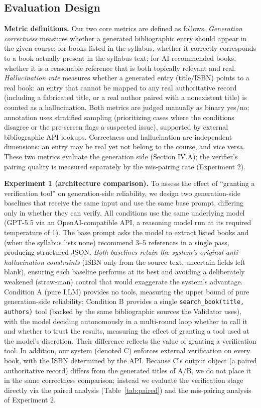 \documentclass[conference]{IEEEtran}
\begin{document}
\subsection{Evaluation Design}
\textbf{Metric definitions.} Our two core metrics are defined as follows.
\textit{Generation correctness} measures whether a generated bibliographic
entry should appear in the given course: for books listed in the syllabus,
whether it correctly corresponds to a book actually present in the syllabus
text; for AI-recommended books, whether it is a reasonable reference that is
both topically relevant and real. \textit{Hallucination rate} measures whether
a generated entry (title/ISBN) points to a real book: an entry that cannot be
mapped to any real authoritative record (including a fabricated title, or a
real author paired with a nonexistent title) is counted as a hallucination.
Both metrics are judged manually as binary yes/no; annotation uses stratified
sampling (prioritizing cases where the conditions disagree or the pre-screen
flags a suspected issue), supported by external bibliographic API lookups.
Correctness and hallucination are independent dimensions: an entry may be real
yet not belong to the course, and vice versa. These two metrics
evaluate the generation side (Section IV.A); the verifier's pairing quality is
measured separately by the mis-pairing rate (Experiment 2).

\textbf{Experiment 1 (architecture comparison).} To assess the effect of
``granting a verification tool'' on generation-side reliability, we design two
generation-side baselines that receive the same input and use the same base
prompt, differing only in whether they can verify. All conditions use the same underlying model (GPT-5.5 via an OpenAI-compatible
API, a reasoning model run at its required temperature of 1). The base prompt
asks the model to extract listed books and (when the syllabus lists none)
recommend 3--5 references in a single pass, producing structured JSON.
\textit{Both baselines retain the system's original anti-hallucination
constraints} (ISBN only from
the source text, uncertain fields left blank), ensuring each baseline performs
at its best and avoiding a deliberately weakened (straw-man) control that would
exaggerate the system's advantage. Condition A (pure LLM) provides no tools,
measuring the upper bound of pure generation-side reliability; Condition B
provides a single \texttt{search\_book(title, authors)} tool (backed by the
same bibliographic sources the Validator uses), with the model deciding
autonomously in a multi-round loop whether to call it and whether to trust the
results, measuring the effect of granting a tool used at the model's
discretion. Their difference reflects the value of granting a verification
tool. In addition, our system (denoted C) enforces external verification on
every book, with the ISBN determined by the API. Because C's output object
(a paired authoritative record) differs from the generated titles of A/B, we do
not place it in the same correctness comparison; instead we evaluate the
verification stage directly via the paired analysis (Table~\ref{tab:paired}) and
the mis-pairing analysis of Experiment 2.
\end{document}
